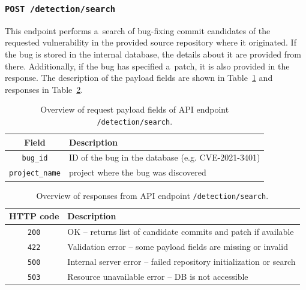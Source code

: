   \subsubsection*{\texttt{POST /detection/search}}
  This endpoint performs a~search of bug-fixing commit candidates of the requested vulnerability in the provided source repository
  where it originated. If the bug is stored in the internal database, the details about it are provided from there.
  Additionally, if the bug has specified a~patch, it is also provided in the response. The description of the payload fields
  are shown in Table~\ref{tab:detection-search-rq} and responses in Table~\ref{tab:detection-search-rs}.

  \begin{table}[h]
        \centering
        \begin{tabular}{|c|l|}
          \hline
            Field & Description \\
          \hline
            \texttt{bug\_id} & ID of the bug in the database (e.g. CVE-2021-3401) \\
            \texttt{project\_name} & project where the bug was discovered \\
          \hline
        \end{tabular}
        \caption{Overview of request payload fields of API endpoint \texttt{/detection/search}.}
        \label{tab:detection-search-rq}
    \end{table}

    \begin{table}[h!]
        \centering
        \begin{tabular}{|c|l|}
          \hline
            HTTP code & Description \\
          \hline
            \texttt{200} & OK -- returns list of candidate commits and patch if available \\
            \texttt{422} & Validation error -- some payload fields are missing or invalid \\
            \texttt{500} & Internal server error -- failed repository initialization or search \\
            \texttt{503} & Resource unavailable error -- DB is not accessible \\
          \hline
        \end{tabular}
        \caption{Overview of responses from API endpoint \texttt{/detection/search}.}
        \label{tab:detection-search-rs}
    \end{table}

